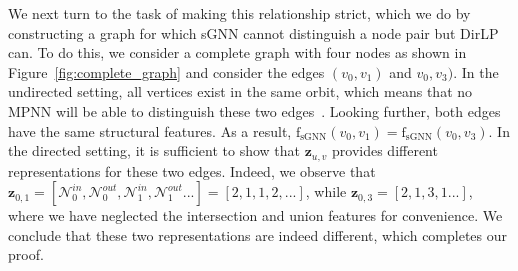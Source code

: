 \documentclass{article}
\begin{document}
We next turn to the task of making this relationship strict, which we do by constructing a graph for which sGNN cannot distinguish a node pair but DirLP can. To do this, we consider a complete graph with four nodes as shown in Figure~\ref{fig:complete_graph} and consider the edges $(v_0, v_1)$ and $v_0, v_3)$. In the undirected setting, all vertices exist in the same orbit, which means that no MPNN will be able to distinguish these two edges~\citep{srinivasan2019equivalence}. Looking further, both edges have the same structural features. As a result, $\operatorname{f_{\operatorname{sGNN}}}(v_0, v_1) = \operatorname{f_{\operatorname{sGNN}}}(v_0, v_3)$. In the directed setting, it is sufficient to show that $\mathbf{z}_{u, v}$ provides different representations for these two edges. Indeed, we observe that $\mathbf{z}_{0, 1} = [ \mathcal{N}^{in}_0, \mathcal{N}^{out}_0, \mathcal{N}^{in}_1, \mathcal{N}^{out}_1... ] = [2, 1, 1, 2, ...]$, while $\mathbf{z}_{0, 3} = [2, 1, 3, 1 ...]$, where we have neglected the intersection and union features for convenience. We conclude that these two representations are indeed different, which completes our proof.
\end{document}
